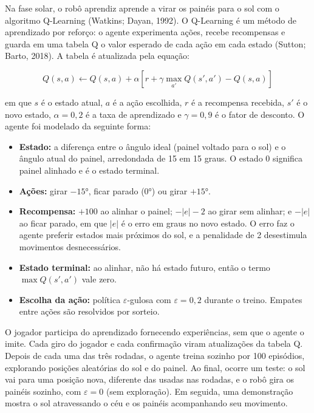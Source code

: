 \documentclass[12pt,a4paper]{article}
\begin{document}
Na fase solar, o robô aprendiz aprende a virar os painéis para o sol com o algoritmo Q-Learning (Watkins; Dayan, 1992). O Q-Learning é um método de aprendizado por reforço: o agente experimenta ações, recebe recompensas e guarda em uma tabela Q o valor esperado de cada ação em cada estado (Sutton; Barto, 2018). A tabela é atualizada pela equação:

\begin{equation}
Q(s,a) \leftarrow Q(s,a) + \alpha \left[ r + \gamma \max_{a'} Q(s',a') - Q(s,a) \right]
\end{equation}

\noindent em que $s$ é o estado atual, $a$ é a ação escolhida, $r$ é a recompensa recebida, $s'$ é o novo estado, $\alpha = 0{,}2$ é a taxa de aprendizado e $\gamma = 0{,}9$ é o fator de desconto. O agente foi modelado da seguinte forma:

\begin{itemize}
\item \textbf{Estado:} a diferença entre o ângulo ideal (painel voltado para o sol) e o ângulo atual do painel, arredondada de 15 em 15 graus. O estado 0 significa painel alinhado e é o estado terminal.
\item \textbf{Ações:} girar $-15$°, ficar parado (0°) ou girar $+15$°.
\item \textbf{Recompensa:} $+100$ ao alinhar o painel; $-|e|-2$ ao girar sem alinhar; e $-|e|$ ao ficar parado, em que $|e|$ é o erro em graus no novo estado. O erro faz o agente preferir estados mais próximos do sol, e a penalidade de 2 desestimula movimentos desnecessários.
\item \textbf{Estado terminal:} ao alinhar, não há estado futuro, então o termo $\max Q(s',a')$ vale zero.
\item \textbf{Escolha da ação:} política $\varepsilon$-gulosa com $\varepsilon = 0{,}2$ durante o treino. Empates entre ações são resolvidos por sorteio.
\end{itemize}

O jogador participa do aprendizado fornecendo experiências, sem que o agente o imite. Cada giro do jogador e cada confirmação viram atualizações da tabela Q. Depois de cada uma das três rodadas, o agente treina sozinho por 100 episódios, explorando posições aleatórias do sol e do painel. Ao final, ocorre um teste: o sol vai para uma posição nova, diferente das usadas nas rodadas, e o robô gira os painéis sozinho, com $\varepsilon = 0$ (sem exploração). Em seguida, uma demonstração mostra o sol atravessando o céu e os painéis acompanhando seu movimento.
\end{document}
